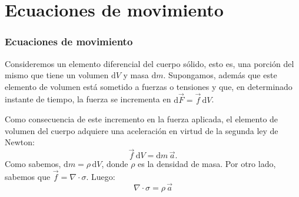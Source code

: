 \documentclass[11pt,handout,aspectratio=1610]{beamer}
\newcommand{\diff}[0]{\text{d}}
\newcommand{\vs}{\vspace{11pt}}
\begin{document}
\section{Ecuaciones de movimiento}

\begin{frame}
    \frametitle{Ecuaciones de movimiento}

    Consideremos un elemento diferencial del cuerpo sólido, esto es, una porción del mismo que tiene un volumen $\diff V$ y masa $\diff m$. Supongamos, además que este elemento de volumen está sometido a fuerzas o tensiones y que, en determinado instante de tiempo, la fuerza se incrementa en $\diff \vec{F} = \vec{f} \, \diff V$. 

    \vs 

    Como consecuencia de este incremento en la fuerza aplicada, el elemento de volumen del cuerpo adquiere una aceleración en virtud de la segunda ley de Newton: $$ \vec{f} \, \diff V = \diff m \, \vec{a}. $$ Como sabemos, $\diff m = \rho \, \diff V$, donde $\rho$ es la densidad de masa. Por otro lado, sabemos que $\vec{f} = \nabla \cdot \sigma$. Luego: $$ \nabla \cdot \sigma = \rho \, \vec{a}$$

\end{frame}
\end{document}
